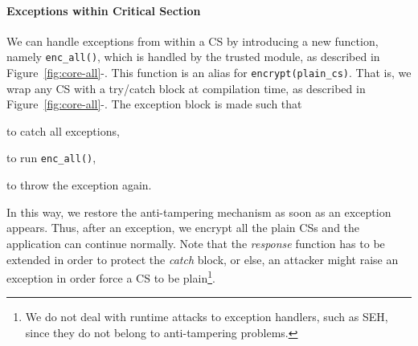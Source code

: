 \paragraph{\textbf{Exceptions within Critical Section}}
We can handle exceptions from within a CS by introducing a new function, namely 
\texttt{enc\_all()}, which is handled by the trusted module, as described in 
Figure~\ref{fig:core-all}-.
This function is an alias for \texttt{encrypt(plain\_cs)}.
That is, we wrap any CS with a try/catch block at compilation time, as 
described in Figure~\ref{fig:core-all}-.
The exception block is made such that
\begin{enumerate*}[label=(\roman*)]
	\item to catch all exceptions, 
	\item to run \texttt{enc\_all()},
	\item to throw the exception again.
\end{enumerate*}
In this way, we restore the anti-tampering mechanism as soon as an exception 
appears. 
Thus, after an exception, we encrypt all the plain CSs and the application can 
continue normally.
Note that the \emph{response} function has to be extended in order to protect 
the \emph{catch} block,
or else, an attacker might raise an exception in order force a CS to be 
plain\footnote{We do not deal with runtime attacks to exception handlers, such 
as SEH, since they do not belong to anti-tampering problems.}.


